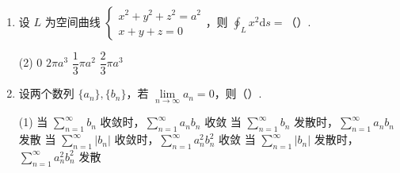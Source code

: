 \documentclass[../Main.tex]{subfiles}
\begin{document}
\begin{enumerate}
          \begin{tasks}[label=\textbf{\Alph*.}, label-width=1.5em, column-sep=1em](1)
              \task \( \displaystyle \int_T f(x, y) \mathrm{d}s \)
              \task \( \displaystyle \int_T f(x, y) \mathrm{d}x \)
              \task \( \displaystyle \int_T f(x, y) \mathrm{d}y \)
              \task \( \displaystyle \int_T f_x'(x, y) \mathrm{d}x + f_y'(x, y) \mathrm{d}y \)
          \end{tasks}

    \item 设 \( L \) 为空间曲线 \( \begin{cases} x^2 + y^2 + z^2 = a^2 \\ x + y + z = 0 \end{cases} \)，则 \( \displaystyle \oint_L x^2 \mathrm{d}s = \)（\qquad）.

          \begin{tasks}[label=\textbf{\Alph*.}, label-width=1.5em, column-sep=1em](2)
              \task \( 0 \)
              \task \( 2\pi a^3 \)
              \task \( \dfrac{1}{3}\pi a^2 \)
              \task \( \dfrac{2}{3}\pi a^3 \)
          \end{tasks}

    \item 设两个数列 \( \{a_n\}, \{b_n\} \)，若 \( \lim\limits_{n \to \infty} a_n = 0 \)，则（\qquad）.

          \begin{tasks}[label=\textbf{\Alph*.}, label-width=1.5em, column-sep=1em](1)
              \task 当 \( \sum \limits_{n=1}^{\infty} b_n \) 收敛时，\( \sum \limits_{n=1}^{\infty} a_n b_n \) 收敛
              \task 当 \( \sum \limits_{n=1}^{\infty} b_n \) 发散时，\( \sum \limits_{n=1}^{\infty} a_n b_n \) 发散
              \task 当 \( \sum \limits_{n=1}^{\infty} |b_n| \) 收敛时，\( \sum \limits_{n=1}^{\infty} a_n^2 b_n^2 \) 收敛
              \task 当 \( \sum \limits_{n=1}^{\infty} |b_n| \) 发散时，\( \sum \limits_{n=1}^{\infty} a_n^2 b_n^2 \) 发散
          \end{tasks}
\end{enumerate}
\end{document}
